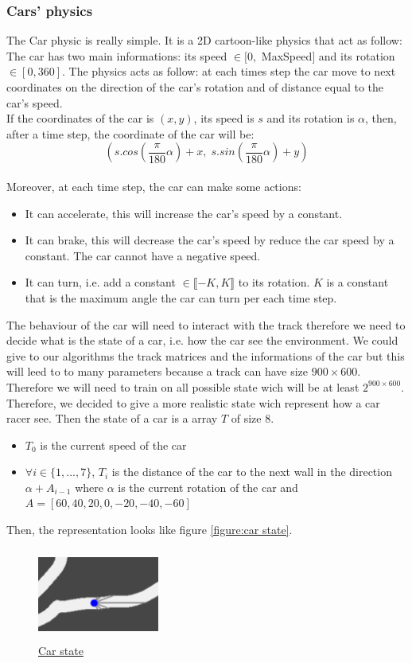\documentclass[11pt,a4paper]{article}
\newcounter{fig}
\newcommand{\mlist}[1]{\begin{itemize}[noitemsep,topsep=0pt]#1\end{itemize}}
\begin{document}
			\subsubsection{Cars' physics}
The Car physic is really simple. It is a 2D cartoon-like physics that act as follow:\\
The car has two main informations: its speed $\in [0,$ MaxSpeed$]$ and its rotation $\in [0,360]$. The physics acts as follow: at each times step the car move to next coordinates on the direction of the car's rotation and of distance equal to the car's speed.\\
If the coordinates of the car is $(x,y)$, its speed is $s$ and its rotation is $\alpha$, then, after a time step, the coordinate of the car will be:
\[(s.cos(\frac{\pi}{180}\alpha) + x,\; s.sin(\frac{\pi}{180}\alpha) + y)\]
\\
Moreover, at each time step, the car can make some actions:
\mlist{
\item It can accelerate, this will increase the car's speed by a constant.
\item It can brake, this will decrease the car's speed by reduce the car speed by a constant. The car cannot have a negative speed.
\item It can turn, i.e. add a constant $\in \llbracket-K,K\rrbracket$ to its rotation. $K$ is a constant that is the maximum angle the car can turn per each time step.
}
The behaviour of the car will need to interact with the track therefore we need to decide what is the state of a car, i.e. how the car see the environment. We could give to our algorithms the track matrices and the informations of the car but this will leed to to many parameters because a track can have size $900\times600$. Therefore we will need to train on all possible state wich will be at least $2^{900\times 600}$. Therefore, we decided to give a more realistic state wich represent how a car racer see. Then the state of a car is a array $T$ of size $8$.
\mlist{
\item $T_0$ is the current speed of the car
\item $\forall i\in\{1,...,7\}$, $T_i$ is the distance of the car to the next wall in the direction $\alpha + A_{i-1}$ where $\alpha$ is the current rotation of the car and $A=[60, 40, 20, 0, -20, -40, -60]$
}
Then, the representation looks like figure \ref{figure:car state}.
\begin{center}
\label{figure:car state}
	\begin{figure}[ht]
		\centering
		\includegraphics[width=4cm, height=3cm]{car_state.png}
		\caption{\underline{Car state}}
	\end{figure}
\end{center}
		
\end{document}
